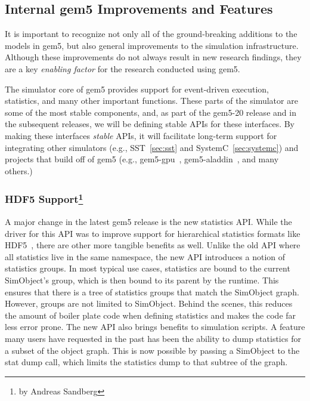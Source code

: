 \subsection{Internal gem5 Improvements and Features}
\label{sec:internal}

It is important to recognize not only all of the ground-breaking additions to the models in gem5, but also general improvements to the simulation infrastructure.
Although these improvements do not always result in new research findings, they are a key \emph{enabling factor} for the research conducted using gem5.

The simulator core of gem5 provides support for event-driven execution, statistics, and many other important functions.
These parts of the simulator are some of the most stable components, and, as part of the gem5-20 release and in the subsequent releases, we will be defining stable APIs for these interfaces.
By making these interfaces \emph{stable} APIs, it will facilitate long-term support for integrating other simulators (e.g., SST~\ref{sec:sst} and SystemC~\ref{sec:systemc}) and projects that build off of gem5 (e.g., gem5-gpu~\cite{}, gem5-aladdin~\cite{}, and many others.)

\subsubsection[HDF5 Support]{HDF5 Support\footnote{by Andreas Sandberg}}

A major change in the latest gem5 release is the new statistics API.
While the driver for this API was to improve support for hierarchical statistics formats like HDF5~\cite{}, there are other more tangible benefits as well.
Unlike the old API where all statistics live in the same namespace, the new API introduces a notion of statistics groups.
In most typical use cases, statistics are bound to the current SimObject's group, which is then bound to its parent by the runtime.
This ensures that there is a tree of statistics groups that match the SimObject graph.
However, groups are not limited to SimObject.
Behind the scenes, this reduces the amount of boiler plate code when defining statistics and makes the code far less error prone.
The new API also brings benefits to simulation scripts.
A feature many users have requested in the past has been the ability to dump statistics for a subset of the object graph.
This is now possible by passing a SimObject to the stat dump call, which limits the statistics dump to that subtree of the graph.

